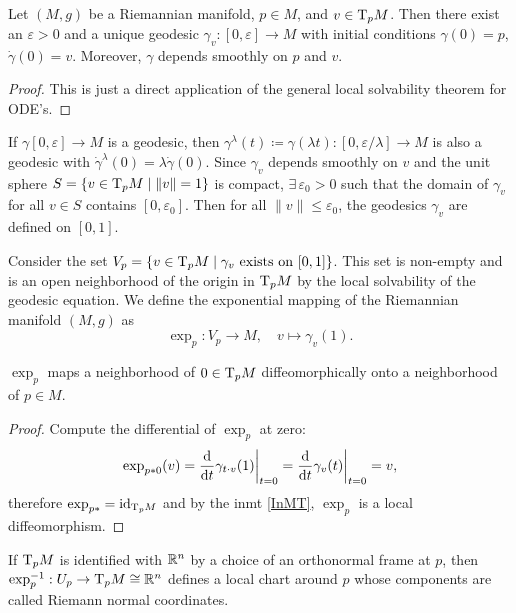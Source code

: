\begin{lem}
    Let $(M,g)$ be a Riemannian manifold, $p\in M$, and $v\in \mathrm{T}_p M$. Then there exist an $\varepsilon>0$ and a unique geodesic $\gamma_v:[0,\varepsilon]\to M$ with initial conditions $\gamma(0)=p$, $\dot\gamma(0)=v$. Moreover, $\gamma $ depends smoothly on $p$ and $v$.
\end{lem}
\begin{proof}
    This is just a direct application of the general local solvability theorem for ODE's.
\end{proof}
\begin{cor}
    If $\gamma[0,\varepsilon]\to M$ is a geodesic, then $\gamma^\lambda(t)\coloneqq \gamma(\lambda t):[0,\varepsilon/\lambda]\to M$ is also a geodesic with $\dot\gamma^\lambda(0)=\lambda\dot\gamma(0)$. Since $\gamma_v$ depends smoothly on $v$ and the unit sphere $S=\{v\in \mathrm{T}_pM\mid \lVert v\rVert=1\}$ is compact, $\exists\,\varepsilon_0>0$ such that the domain of $\gamma_v$ for all $v\in S$ contains $[0,\varepsilon_0]$. Then for all $\lVert v\rVert\leq \varepsilon_0$, the geodesics $\gamma_v$ are defined on $[0,1]$.
\end{cor}
\begin{defn}
    Consider the set $V_p=\{v\in \mathrm{T}_p M\mid \gamma_v \text{ exists on }\allowbreak [0,1]\}$. This set is non-empty and is an open neighborhood of the origin in $\mathrm{T}_p M$ by the local solvability of the geodesic equation. We define the exponential mapping of the Riemannian manifold $(M,g)$ as
    \[\exp_p :V_p\to M,\quad v\mapsto \gamma_v(1).\]
\end{defn}

\begin{thm}
    $\exp_p$ maps a neighborhood of $0\in \mathrm{T}_pM$ diffeomorphically onto a neighborhood of $p\in M$.
\end{thm}
\begin{proof}
    Compute the differential of $\exp_p$ at zero:
    \[\exp_{p\ast0}(v)=\restr{\frac{\dd}{\dd t}\gamma_{t\cdot v}(1)}{t=0}=\restr{\frac{\dd}{\dd t}\gamma_{v}(t)}{t=0}=v,\]
    therefore $\exp_{p\ast}=\operatorname{id}_{\mathrm{T}_p M}$ and by the \gls{inmt} \ref{InMT}, $\exp_p$ is a local diffeomorphism.
\end{proof}

\begin{defn}
    If $\mathrm{T}_p M$ is identified with $\mathbb{R}^n$ by a choice of an orthonormal frame at $p$, then $\exp_p^{-1}:U_p\to \mathrm{T}_p M\cong\mathbb{R}^n$ defines a local chart around $p$ whose components are called Riemann normal coordinates.
\end{defn}

